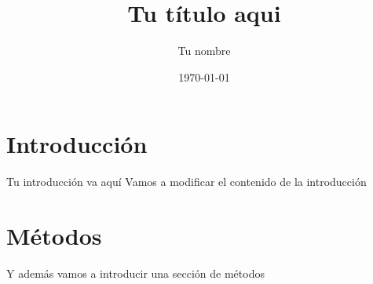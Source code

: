 \documentclass{article}
\title{Tu título aqui}
\author{Tu nombre}
\date{\today}
\begin{document}
\maketitle

\section{Introducción}

Tu introducción va aquí
Vamos a modificar el contenido de la introducción

\section {Métodos}

Y además vamos a introducir una sección de métodos
\end{document}

